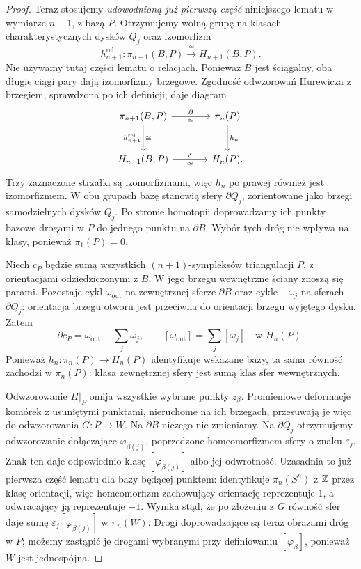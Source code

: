 \begin{proof}
Teraz stosujemy \emph{udowodnioną już pierwszą część}
niniejszego lematu w wymiarze $n+1$, z bazą $P$.
Otrzymujemy wolną grupę na klasach charakterystycznych
dysków $Q_j$ oraz izomorfizm
\[
 h_{n+1}^{\mathrm{rel}}:
 \pi_{n+1}(B,P)\xrightarrow{\ \cong\ }H_{n+1}(B,P).
\]
Nie używamy tutaj części lematu o relacjach.
Ponieważ $B$ jest ściągalny, oba długie ciągi pary dają
izomorfizmy brzegowe. Zgodność odwzorowań Hurewicza
z brzegiem, sprawdzona po ich definicji, daje diagram
\[
\begin{tikzcd}[column sep=large,row sep=large]
 \pi_{n+1}(B,P) \arrow[r,"\partial","\cong"']
  \arrow[d,"h_{n+1}^{\mathrm{rel}}" left,"\cong" right]
 &\pi_n(P) \arrow[d,"h_n"]\\
 H_{n+1}(B,P) \arrow[r,"\delta","\cong"']
 &H_n(P).
\end{tikzcd}
\]
Trzy zaznaczone strzałki są izomorfizmami, więc $h_n$
po prawej również jest izomorfizmem. W obu grupach bazę
stanowią sfery $\partial Q_j$, zorientowane jako brzegi
samodzielnych dysków $Q_j$. Po stronie homotopii doprowadzamy
ich punkty bazowe drogami w $P$ do jednego punktu na $\partial B$.
Wybór tych dróg nie wpływa na klasy, ponieważ $\pi_1(P)=0$.

Niech $c_P$ będzie sumą wszystkich $(n+1)$-sympleksów
triangulacji $P$, z orientacjami odziedziczonymi z $B$.
W jego brzegu wewnętrzne ściany znoszą się parami.
Pozostaje cykl $\omega_{\mathrm{out}}$ na zewnętrznej
sferze $\partial B$ oraz cykle $-\omega_j$ na sferach
$\partial Q_j$: orientacja brzegu otworu jest przeciwna
do orientacji brzegu wyjętego dysku. Zatem
\[
 \partial c_P=\omega_{\mathrm{out}}-\sum_j\omega_j,
 \qquad
 [\omega_{\mathrm{out}}]=\sum_j[\omega_j]
 \quad\text{w }H_n(P).
\]
Ponieważ $h_n:\pi_n(P)\to H_n(P)$ identyfikuje wskazane
bazy, ta sama równość zachodzi w $\pi_n(P)$:
klasa zewnętrznej sfery jest sumą klas sfer wewnętrznych.

Odwzorowanie $H|_P$ omija wszystkie wybrane punkty $z_\beta$.
Promieniowe deformacje komórek z usuniętymi punktami,
nieruchome na ich brzegach, przesuwają je więc do
odwzorowania $G:P\to W$. Na $\partial B$ niczego nie zmieniamy.
Na $\partial Q_j$ otrzymujemy odwzorowanie dołączające
$\varphi_{\beta(j)}$, poprzedzone homeomorfizmem sfery
o znaku $\varepsilon_j$. Znak ten daje odpowiednio klasę
$[\varphi_{\beta(j)}]$ albo jej odwrotność.
Uzasadnia to już pierwsza część lematu dla bazy będącej
punktem: identyfikuje $\pi_n(S^n)$ z $\mathbb{Z}$ przez klasę orientacji,
więc homeomorfizm zachowujący orientację reprezentuje $1$,
a odwracający ją reprezentuje $-1$.
Wynika stąd, że po złożeniu z $G$ równość sfer daje
sumę $\varepsilon_j[\varphi_{\beta(j)}]$ w $\pi_n(W)$.
Drogi doprowadzające są teraz obrazami dróg w $P$;
możemy zastąpić je drogami wybranymi przy definiowaniu
$[\varphi_\beta]$, ponieważ $W$ jest jednospójna.


\end{proof}
